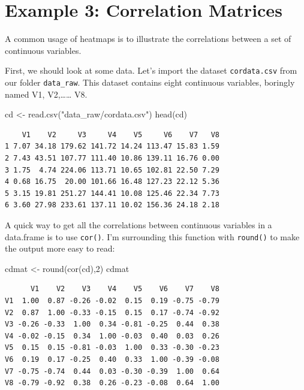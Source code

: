 \documentclass[
  letterpaper,
  DIV=11,
  numbers=noendperiod]{scrreprt}
\newenvironment{Shaded}{\begin{snugshade}}{\end{snugshade}}
\newcommand{\DecValTok}[1]{\textcolor[rgb]{0.68,0.00,0.00}{#1}}
\newcommand{\FunctionTok}[1]{\textcolor[rgb]{0.28,0.35,0.67}{#1}}
\newcommand{\NormalTok}[1]{\textcolor[rgb]{0.00,0.23,0.31}{#1}}
\newcommand{\OtherTok}[1]{\textcolor[rgb]{0.00,0.23,0.31}{#1}}
\newcommand{\StringTok}[1]{\textcolor[rgb]{0.13,0.47,0.30}{#1}}
\begin{document}
\hypertarget{example-3-correlation-matrices}{%
\section{\texorpdfstring{\textbf{Example 3: Correlation
Matrices}}{Example 3: Correlation Matrices}}\label{example-3-correlation-matrices}}

A common usage of heatmaps is to illustrate the correlations between a
set of continuous variables.

First, we should look at some data. Let's import the dataset
\texttt{cordata.csv} from our folder \texttt{data\_raw}. This dataset
contains eight continuous variables, boringly named V1,
V2,\ldots\ldots{} V8.

\begin{Shaded}
\begin{Highlighting}[]
\NormalTok{cd }\OtherTok{\textless{}{-}} \FunctionTok{read.csv}\NormalTok{(}\StringTok{"data\_raw/cordata.csv"}\NormalTok{)}
\FunctionTok{head}\NormalTok{(cd)}
\end{Highlighting}
\end{Shaded}

\begin{verbatim}
    V1    V2     V3     V4    V5     V6    V7   V8
1 7.07 34.18 179.62 141.72 14.24 113.47 15.83 1.59
2 7.43 43.51 107.77 111.40 10.86 139.11 16.76 0.00
3 1.75  4.74 224.06 113.71 10.65 102.81 22.50 7.29
4 0.68 16.75  20.00 101.66 16.48 127.23 22.12 5.36
5 3.15 19.81 251.27 144.41 10.08 125.46 22.34 7.73
6 3.60 27.98 233.61 137.11 10.02 156.36 24.18 2.18
\end{verbatim}

A quick way to get all the correlations between continuous variables in
a data.frame is to use \texttt{cor()}. I'm surrounding this function
with \texttt{round()} to make the output more easy to read:

\begin{Shaded}
\begin{Highlighting}[]
\NormalTok{cdmat }\OtherTok{\textless{}{-}} \FunctionTok{round}\NormalTok{(}\FunctionTok{cor}\NormalTok{(cd),}\DecValTok{2}\NormalTok{)}
\NormalTok{cdmat}
\end{Highlighting}
\end{Shaded}

\begin{verbatim}
      V1    V2    V3    V4    V5    V6    V7    V8
V1  1.00  0.87 -0.26 -0.02  0.15  0.19 -0.75 -0.79
V2  0.87  1.00 -0.33 -0.15  0.15  0.17 -0.74 -0.92
V3 -0.26 -0.33  1.00  0.34 -0.81 -0.25  0.44  0.38
V4 -0.02 -0.15  0.34  1.00 -0.03  0.40  0.03  0.26
V5  0.15  0.15 -0.81 -0.03  1.00  0.33 -0.30 -0.23
V6  0.19  0.17 -0.25  0.40  0.33  1.00 -0.39 -0.08
V7 -0.75 -0.74  0.44  0.03 -0.30 -0.39  1.00  0.64
V8 -0.79 -0.92  0.38  0.26 -0.23 -0.08  0.64  1.00
\end{verbatim}
\end{document}
